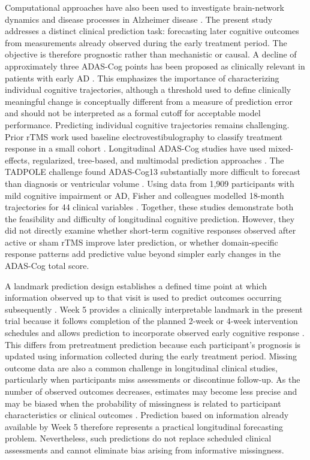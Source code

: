 \documentclass[11pt]{article}
\begin{document}
Computational approaches have also been used to investigate brain-network dynamics
and disease processes in Alzheimer disease \citep{shaheen_brain_2025}. The present
study addresses a distinct clinical prediction task: forecasting later cognitive outcomes
from measurements already observed during the early treatment period. The objective
is therefore prognostic rather than mechanistic or causal. A decline of approximately three ADAS-Cog points has been proposed as clinically
relevant in patients with early AD \citep{schrag2012clinically}. This emphasizes the
importance of characterizing individual cognitive trajectories, although a threshold
used to define clinically meaningful change is conceptually different from a measure
of prediction error and should not be interpreted as a formal cutoff for acceptable
model performance. Predicting individual cognitive trajectories remains challenging.
Prior rTMS work used baseline electrovestibulography to classify treatment response in
a small cohort \citep{lithgow2022baseline}. Longitudinal ADAS-Cog studies have used
mixed-effects, regularized, tree-based, and multimodal prediction approaches
\citep{Khan2013,prakash2021quantitative}. The TADPOLE challenge found ADAS-Cog13
substantially more difficult to forecast than diagnosis or ventricular volume
\citep{marinescu2021tadpole}. Using data from 1,909 participants with mild cognitive
impairment or AD, Fisher and colleagues modelled 18-month trajectories for 44 clinical
variables \citep{fisher2019forecasting}. Together, these studies demonstrate both the
feasibility and difficulty of longitudinal cognitive prediction. However, they did not
directly examine whether short-term cognitive responses observed after active or sham
rTMS improve later prediction, or whether domain-specific response patterns add
predictive value beyond simpler early changes in the ADAS-Cog total score.

A landmark prediction design establishes a defined time point at which information
observed up to that visit is used to predict outcomes occurring subsequently
\citep{vanhouwelingen2007landmark}. Week 5 provides a clinically interpretable
landmark in the present trial because it follows completion of the planned 2-week or
4-week intervention schedules and allows prediction to incorporate observed early
cognitive response \citep{moussavi2021protocol,moussavi2024trial}. This differs from
pretreatment prediction because each participant's prognosis is updated using
information collected during the early treatment period. Missing outcome data are also a common challenge in longitudinal clinical studies,
particularly when participants miss assessments or discontinue follow-up. As the
number of observed outcomes decreases, estimates may become less precise and may be
biased when the probability of missingness is related to participant characteristics or
clinical outcomes \citep{sterne2009missing,nationalresearchcouncil2010missing}.
Prediction based on information already available by Week 5 therefore represents a
practical longitudinal forecasting problem. Nevertheless, such predictions do not
replace scheduled clinical assessments and cannot eliminate bias arising from
informative missingness.
\end{document}
